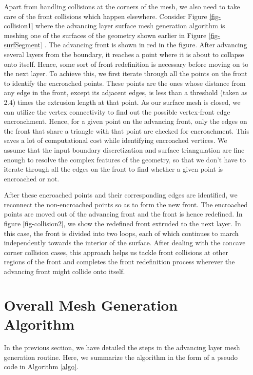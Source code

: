 Apart from handling collisions at the corners of the mesh, we also need to take care of the front collisions which happen elsewhere. Consider Figure \ref{fig-collision1} where the advancing layer surface mesh generation algorithm is meshing one of the surfaces of the geometry shown earlier in Figure \ref{fig-surfSegment} . The advancing front is shown in red in the figure. After advancing several layers from the boundary, it reaches a point where it is about to collapse onto itself. Hence, some sort of front redefinition is necessary before moving on to the next layer. To achieve this, we first iterate through all the points on the front to identify the encroached points. These points are the ones whose distance from any edge in the front, except its adjacent edges, is less than a threshold (taken as $2.4$) times the extrusion length at that point. As our surface mesh is closed, we can utilize the vertex connectivity to find out the possible vertex-front edge encroachment. Hence, for a given point on the advancing front, only the edges on the front that share a triangle with that point are checked for encroachment. This saves a lot of computational cost while identifying encroached vertices. We assume that the input boundary discretization and surface triangulation are fine enough to resolve the complex features of the geometry, so that we don't have to iterate through all the edges on the front to find whether a given point is encroached or not.

After these encroached points and their corresponding edges are identified, we reconnect the non-encroached points so as to form the new front. The encroached points are moved out of the advancing front and the front is hence redefined. In figure \ref{fig-collision2}, we show the redefined front extruded to the next layer. In this case, the front is divided into two loops, each of which continues to march independently towards the interior of the surface. After dealing with the concave corner collision cases, this approach helps us tackle front collisions at other regions of the front  and completes the front redefinition process wherever the advancing front might collide onto itself.

\section{Overall Mesh Generation Algorithm}
In the previous section, we have detailed the steps in the advancing layer mesh generation routine. Here, we summarize the algorithm in the form of a pseudo code in Algorithm \ref{algo}.

